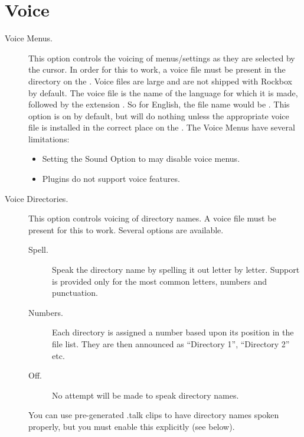 \section{\label{ref:Voiceconfiguration}Voice}

  \begin{description}
  \item[Voice Menus.]
    This option controls the voicing of menus/settings as they are selected
    by the cursor. In order for this to work, a voice file must be present 
    in the  directory on the \dap.  Voice files are large
    and are not shipped with Rockbox by default.
    The voice file is the name of the language for which it is made, followed
    by the extension .  So for English, the file name would be 
    .
    This option is on by default, but will do nothing unless the 
    appropriate voice file is installed in the correct place on the \dap.
    The Voice Menus have several limitations:
    \begin{itemize}
    \item Setting the Sound Option  to  may 
      disable voice menus.
    \item Plugins  do not support
      voice features.
    \end{itemize}

  \item[Voice Directories.]
    This option controls voicing of directory names. A voice file must be present 
    for this to work. Several options are available.
    \begin{description}
    \item[Spell.]
      Speak the directory name by spelling it out letter by letter.  Support
      is provided only for the most common letters, numbers and punctuation.
    \item[Numbers.]
      Each directory is assigned a number based upon its position in the
      file list.  They are then announced as ``Directory 1'', ``Directory 2''
      etc.
    \item[Off.]
      No attempt will be made to speak directory names.
    \end{description}
    You can use pre-generated .talk clips to have  directory names spoken 
    properly, but you must enable this explicitly (see below).


\end{description}
